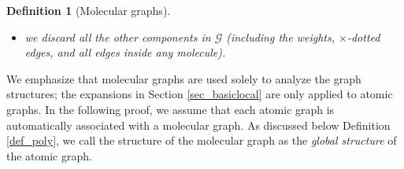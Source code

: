 \documentclass{article}
\newcommand{\1}{\mathds{1}}
\numberwithin{equation}{section}
\renewcommand{\cal}{\mathcal}
\newcommand{\dashed}{\text{diffusive}}
\DeclareMathOperator{\OO}{O}
\theoremstyle{plain} %
\newtheorem{definition}[theorem]{Definition}
\theoremstyle{remark}
\newcommand{\cor}{\color{red}}
\newcommand{\nc}{\normalcolor}
\newcommand{\hty}[1]{{\cor (ht: #1) }}
\begin{document}
\begin{definition}[Molecular graphs]
\begin{itemize}

\item we discard all the other components in $\cal G$ (including the weights, $\times$-dotted edges, %
and  %
all edges inside any molecule). %
\end{itemize}
\end{definition}

We emphasize that molecular graphs are used solely to analyze the graph structures; the expansions in Section \ref{sec_basiclocal}  are only applied to atomic graphs. In the following proof, we assume that each atomic graph is automatically associated with a molecular graph. As discussed below Definition \ref{def_poly}, we call 
the structure of the molecular graph as the {\it global structure} of the atomic graph.  

\end{document}
